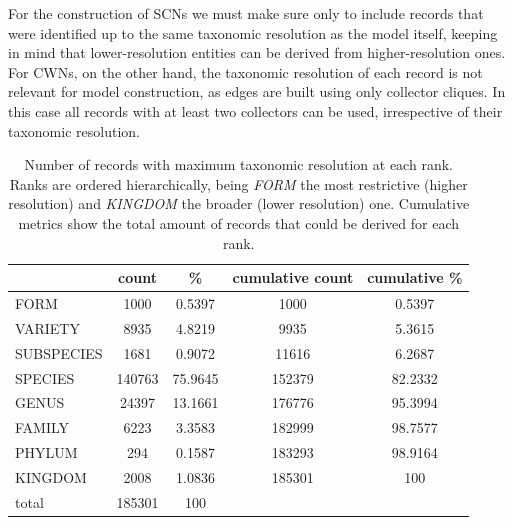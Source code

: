For the construction of SCNs we must make sure only to include records that were identified up to the same taxonomic resolution as the model itself, keeping in mind that lower-resolution entities can be derived from higher-resolution ones. 
For CWNs, on the other hand, the taxonomic resolution of each record is not relevant for model construction, as edges are built using only collector cliques. In this case all records with at least two collectors can be used, irrespective of their taxonomic resolution.

\begin{table}[H]
  \caption{Number of records with maximum taxonomic resolution at each rank. Ranks are ordered hierarchically, being \textit{FORM} the most restrictive (higher resolution) and \textit{KINGDOM} the broader (lower resolution) one. Cumulative metrics show the total amount of records that could be derived for each rank.}
  \begin{center}
  \begin{tabular}{l c c c c}
       & count & \% & cumulative count & cumulative \% \\
      \hline
      FORM & 1000 & 0.5397 & 1000 & 0.5397\\
      VARIETY & 8935 & 4.8219 & 9935 & 5.3615\\
      SUBSPECIES & 1681 & 0.9072 & 11616 & 6.2687\\
      SPECIES & 140763 & 75.9645 & 152379 & 82.2332\\
      GENUS & 24397 & 13.1661 & 176776 & 95.3994\\
      FAMILY & 6223 & 3.3583 & 182999 & 98.7577\\
      PHYLUM & 294 & 0.1587 & 183293 & 98.9164\\
      KINGDOM & 2008 & 1.0836 & 185301 & 100\\
      \hline
      total & 185301 & 100 & &
  \end{tabular}
  \end{center}
  \label{table:dset_taxonomicres_counts}
\end{table}


